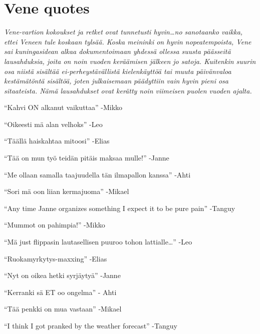 
\section{Vene quotes}

\textit{Vene-vartion kokoukset ja retket ovat tunnetusti hyvin…no sanotaanko vaikka,
ettei Veneen tule koskaan tylsää. Koska meininki on hyvin nopeatempoista, Vene
sai kuningasidean alkaa dokumentoimaan yhdessä ollessa suusta päässeitä
lausahduksia, joita on noin vuoden keräämisen jälkeen jo satoja. Kuitenkin
suurin osa niistä sisältää ei-perheystävällistä kielenkäyttöä tai muuta
päivänvaloa kestämätöntä sisältöä, joten julkaisemaan päädyttiin vain hyvin
pieni osa sitaateista. Nämä lausahdukset ovat kerätty noin viimeisen puolen
vuoden ajalta.}

\vspace{0.64cm}
“Kahvi ON alkanut vaikuttaa” -Mikko

\smallskip
“Oikeesti mä alan velhoks” -Leo

\smallskip
“Täällä haiskahtaa mitoosi” -Elias

\smallskip
“Tää on mun työ teidän pitäis maksaa mulle!” -Janne

\smallskip
“Me ollaan samalla taajuudella tän ilmapallon kanssa” -Ahti

\smallskip
“Sori mä oon liian kermajuoma” -Mikael

\smallskip
“Any time Janne organizes something I expect it to be pure pain” -Tanguy

\smallskip
“Mummot on pahimpia!” -Mikko

\smallskip
“Mä just flippasin lautasellisen puuroo tohon lattialle…” -Leo

\smallskip
“Ruokamyrkytys-maxxing” -Elias

\smallskip
“Nyt on oikea hetki syrjäytyä” -Janne

\smallskip
“Kerranki sä ET oo ongelma” - Ahti

\smallskip
“Tää penkki on mua vastaan” -Mikael

\smallskip
“I think I got pranked by the weather forecast” -Tanguy

